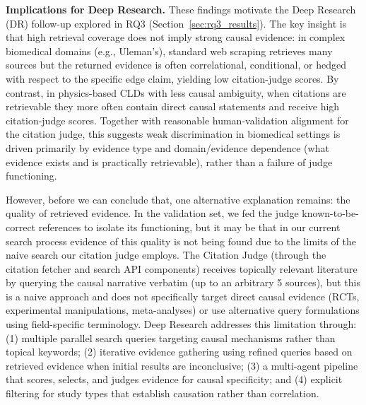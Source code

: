 \noindent\textbf{Implications for Deep Research.} These findings motivate the Deep Research (DR) follow-up explored in RQ3 (Section~\ref{sec:rq3_results}). The key insight is that high retrieval coverage does not imply strong causal evidence: in complex biomedical domains (e.g., Uleman's), standard web scraping retrieves many sources but the returned evidence is often correlational, conditional, or hedged with respect to the specific edge claim, yielding low citation-judge scores. By contrast, in physics-based CLDs with less causal ambiguity, when citations are retrievable they more often contain direct causal statements and receive high citation-judge scores. Together with reasonable human-validation alignment for the citation judge, this suggests weak discrimination in biomedical settings is driven primarily by evidence type and domain/evidence dependence (what evidence exists and is practically retrievable), rather than a failure of judge functioning.

However, before we can conclude that, one alternative explanation remains: the quality of retrieved evidence. In the validation set, we fed the judge known-to-be-correct references to isolate its functioning, but it may be that in our current search process evidence of this quality is not being found due to the limits of the naive search our citation judge employs. The Citation Judge (through the citation fetcher and search API components) receives topically relevant literature by querying the causal narrative verbatim (up to an arbitrary 5 sources), but this is a naive approach and does not specifically target direct causal evidence (RCTs, experimental manipulations, meta-analyses) or use alternative query formulations using field-specific terminology. Deep Research addresses this limitation through: (1) multiple parallel search queries targeting causal mechanisms rather than topical keywords; (2) iterative evidence gathering using refined queries based on retrieved evidence when initial results are inconclusive; (3) a multi-agent pipeline that scores, selects, and judges evidence for causal specificity; and (4) explicit filtering for study types that establish causation rather than correlation.

